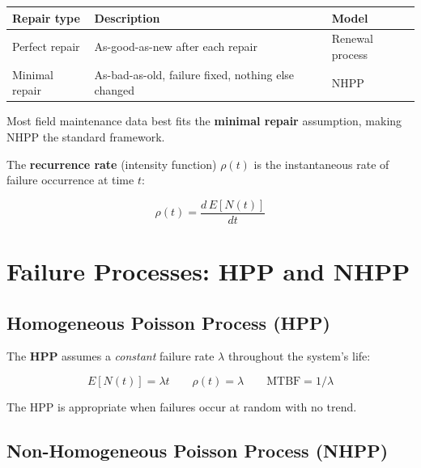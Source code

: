 \documentclass[
  letterpaper,
  DIV=11,
  numbers=noendperiod]{scrreprt}
\newcounter{none} %
\begin{document}
{\def\LTcaptype{none} %
\begin{longtable}[]{@{}
  >{\raggedright\arraybackslash}p{}
  >{\raggedright\arraybackslash}p{}
  >{\raggedright\arraybackslash}p{}@{}}
\toprule\noalign{}
\begin{minipage}[b]{\linewidth}\raggedright
Repair type
\end{minipage} & \begin{minipage}[b]{\linewidth}\raggedright
Description
\end{minipage} & \begin{minipage}[b]{\linewidth}\raggedright
Model
\end{minipage} \\
\midrule\noalign{}
\endhead
\bottomrule\noalign{}
\endlastfoot
Perfect repair & As-good-as-new after each repair & Renewal process \\
Minimal repair & As-bad-as-old, failure fixed, nothing else changed &
NHPP \\
\end{longtable}
}

Most field maintenance data best fits the \textbf{minimal repair}
assumption, making NHPP the standard framework.

The \textbf{recurrence rate} (intensity function) \(\rho(t)\) is the
instantaneous rate of failure occurrence at time \(t\):

\[\rho(t) = \frac{d\,E[N(t)]}{dt}\]

\section{Failure Processes: HPP and
NHPP}\label{failure-processes-hpp-and-nhpp}

\subsection{Homogeneous Poisson Process
(HPP)}\label{homogeneous-poisson-process-hpp}

The \textbf{HPP} assumes a \emph{constant} failure rate \(\lambda\)
throughout the system's life:

\[E[N(t)] = \lambda t \qquad \rho(t) = \lambda \qquad \text{MTBF} = 1/\lambda\]

The HPP is appropriate when failures occur at random with no trend.

\subsection{Non-Homogeneous Poisson Process
(NHPP)}\label{non-homogeneous-poisson-process-nhpp}
\end{document}
